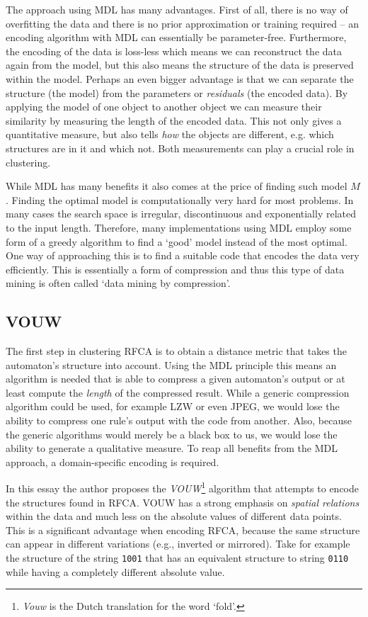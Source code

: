 \documentclass{llncs}
\begin{document}
The approach using MDL has many advantages. First of all, there is no way of overfitting the data and there is no prior approximation or training required -- an encoding algorithm with MDL can essentially be parameter-free. Furthermore, the encoding of the data is loss-less which means we can reconstruct the data again from the model, but this also means the structure of the data is preserved within the model. Perhaps an even bigger advantage is that we can separate the structure (the model) from the parameters or \emph{residuals} (the encoded data). By applying the model of one object to another object we can measure their similarity by measuring the length of the encoded data. This not only gives a quantitative measure, but also tells \emph{how} the objects are different, e.g. which structures are in it and which not. Both measurements can play a crucial role in clustering.

While MDL has many benefits it also comes at the price of finding such model $M$. Finding the optimal model is computationally very hard for most problems. In many cases the search space is irregular, discontinuous and exponentially related to the input length. Therefore, many implementations using MDL employ some form of a greedy algorithm to find a `good' model instead of the most optimal. One way of approaching this is to find a suitable code that encodes the data very efficiently. This is essentially a form of compression and thus this type of data mining is often called `data mining by compression'.

\subsection{VOUW}
The first step in clustering RFCA is to obtain a distance metric that takes the automaton's structure into account. Using the MDL principle this means an algorithm is needed that is able to compress a given automaton's output or at least compute the \emph{length} of the compressed result. While a generic compression algorithm could be used, for example LZW or even JPEG, we would lose the ability to compress one rule's output with the code from another. Also, because the generic algorithms would merely be a black box to us, we would lose the ability to generate a qualitative measure. To reap all benefits from the MDL approach, a domain-specific encoding is required.

In this essay the author proposes the \emph{VOUW}\footnote{\emph{Vouw} is the Dutch translation for the word `fold'.} algorithm that attempts to encode the structures found in RFCA. VOUW has a strong emphasis on \emph{spatial relations} within the data and much less on the absolute values of different data points. This is a significant advantage when encoding RFCA, because the same structure can appear in different variations (e.g., inverted or mirrored). Take for example the structure of the string \texttt{1001} that has an equivalent structure to string \texttt{0110} while having a completely different absolute value. 
\end{document}
